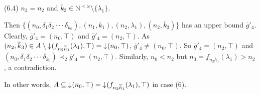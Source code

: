 \documentclass[preprint,12pt]{elsarticle}
\numberwithin{equation}{section}
\newcommand{\dn}{\mathord{\downarrow}\hspace{0.05em}}
\begin{document}
(6.4) $n_{3}=n_{2}$ and $\overline{k}_{3}\in\mathbb{N}^{<\omega}\setminus\{\lambda_{1}\}$.

Then  $\{(n_{0},\delta_{1}\delta_{2}\cdot\cdot\cdot\delta_{k_{0}}),(n_{1},k_{1}),(n_{2},\lambda_{1}), (n_{2},\overline{k}_{3})\}$ has an upper bound $\overline{g}'_{4}$. Clearly, $\overline{g}'_{4}=(n_{0},\top)$ and $\overline{g}'_{4}=(n_{2},\top)$. As $(n_{2},\overline{k}_{3})\in A\setminus\dn(f_{n_{2}\overline{h}_{1}}(\lambda_{1}),\top)=\dn(n_{0},\top)$, $\overline{g}'_{4}\neq(n_{0},\top)$. So $\overline{g}'_{4}=(n_{2},\top)$ and $(n_{0},\delta_{1}\delta_{2}\cdot\cdot\cdot\delta_{k_{0}})\prec_{2}\overline{g}'_{4}=(n_{2},\top)$. Similarly, $n_{0}<n_{2}$ but $n_{0}=f_{n_{2}\overline{h}_{1}}(\lambda_{1})>n_{2}$, a contradiction.

In other words, $A\subseteq\dn(n_{0},\top)=\dn(f_{n_{2}\overline{h}_{1}}(\lambda_{1}),\top)$ in case (6).





\end{document}
